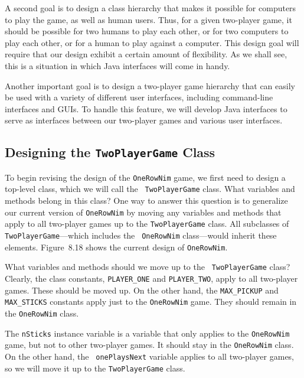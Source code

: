 A second goal is to design a class hierarchy that makes it possible
for computers to play the game, as well as human users. Thus, for a
given two-player game, it should be possible for two humans to play
each other, or for two computers to play each other, or for a human
to play against a computer.  This design goal will require that our
design exhibit a certain amount of flexibility.  As we shall see, this
is a situation in which Java interfaces will come in handy.

Another important goal is to design a two-player game hierarchy that
can easily be used with a variety of different user interfaces,
including command-line interfaces and GUIs.  To handle this feature,
we will develop Java interfaces to serve as interfaces
between our two-player games and various user interfaces.

\subsection{Designing the {\tt TwoPlayerGame} Class}

To begin revising the design of the {\tt OneRowNim} game, we first
need to design a top-level class, which we will call the {\tt
TwoPlayerGame} class.  What variables and methods belong in this
class?  One way to answer this question is to generalize our current
version of {\tt OneRowNim} by moving any variables and methods that
apply to all two-player games up to the {\tt TwoPlayerGame} class.
All subclasses of {\tt TwoPlayerGame}---which includes the {\tt
OneRowNim} class---would inherit these elements.  Figure~8.18 shows
the current design of {\tt OneRowNim}.

What variables and methods should we move up to the {\tt
TwoPlayer\-Game} class?  Clearly, the class constants, {\tt PLAYER\_ONE}
and {\tt PLAYER\_TWO}, apply to all two-player games. These
should be moved up.  On the other hand, the {\tt MAX\_PICKUP} and {\tt
MAX\_STICKS} constants apply just to the {\tt OneRowNim} game. They
should remain in the {\tt OneRowNim} class.

The {\tt nSticks} instance variable is a variable that only applies to
the {\tt OneRowNim} game, but not to other two-player games. It should
stay in the {\tt OneRowNim} class. On the other hand, the {\tt
onePlaysNext} variable applies to all two-player games, so we will
move it up to the {\tt TwoPlayerGame} class.

